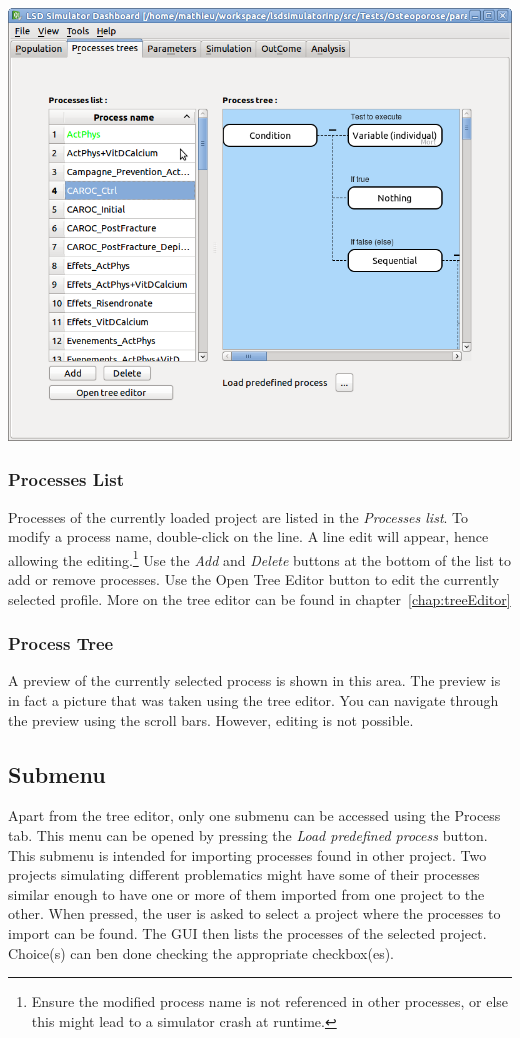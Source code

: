 \documentclass[a4paper,11pt]{report}
\begin{document}
\begin{center}
\includegraphics[scale=0.3]{Pictures/Processes/ProcessTab.png}
\label{fig:procTab}
\end{center}

\subsubsection{Processes List}
Processes of the currently loaded project are listed in the \emph{Processes list}. To modify a process name, double-click on the line. A line edit will appear, hence allowing the editing.\footnote{Ensure the modified process name is not referenced in other processes, or else this might lead to a simulator crash at runtime.} Use the \emph{Add} and \emph{Delete} buttons at the bottom of the list to add or remove processes. Use the {Open Tree Editor} button to edit the currently selected profile. More on the tree editor can be found in chapter~\ref{chap:treeEditor}

\subsubsection{Process Tree}
A preview of the currently selected process is shown in this area. The preview is in fact a picture that was taken using the tree editor. You can navigate through the preview using the scroll bars. However, editing is not possible.
\subsection{Submenu}
Apart from the tree editor, only one submenu can be accessed using the Process tab. This menu can be opened by pressing the \emph{Load predefined process} button.
This submenu is intended for importing processes found in other project. Two projects simulating different problematics might have some of their processes similar enough to have one or more of them imported from one project to the other. When pressed, the user is asked to select a project where the processes to import can be found. The GUI then lists the processes of the selected project. Choice(s) can ben done checking the appropriate checkbox(es).
\end{document}
